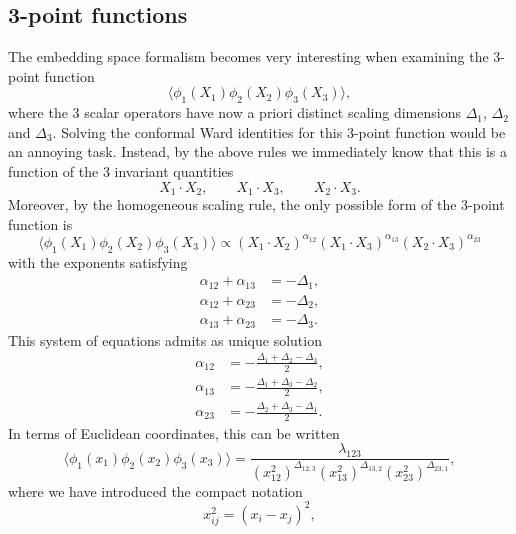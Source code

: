 \documentclass[a4paper,12pt]{article}
\numberwithin{equation}{section}
\begin{document}
\subsection{3-point functions}

The embedding space formalism becomes very interesting when examining the 3-point function
\begin{equation}
	\langle \phi_1(X_1) \phi_2(X_2) \phi_3(X_3) \rangle,
\end{equation}
where the 3 scalar operators have now a priori distinct scaling dimensions $\Delta_1$, $\Delta_2$ and $\Delta_3$.
Solving the conformal Ward identities for this 3-point function would be an annoying task. Instead, by the above rules we immediately know that this is a function of the 3 invariant quantities 
\begin{equation}
	X_1 \cdot X_2,
	\qquad
	X_1 \cdot X_3,
	\qquad
	X_2 \cdot X_3.
\end{equation}
Moreover, by the homogeneous scaling rule, the only possible form of the 3-point function is
\begin{equation}
	\langle \phi_1(X_1) \phi_2(X_2) \phi_3(X_3) \rangle
	\propto
	(X_1 \cdot X_2)^{\alpha_{12}}
	(X_1 \cdot X_3)^{\alpha_{13}}
	(X_2 \cdot X_3)^{\alpha_{23}}
\end{equation}
with the exponents satisfying 
\begin{align}
	\alpha_{12} + \alpha_{13} &= - \Delta_1,
	\nonumber \\
	\alpha_{12} + \alpha_{23} &= - \Delta_2,
	\\
	\alpha_{13} + \alpha_{23} &= - \Delta_3.
	\nonumber
\end{align}
This system of equations admits as unique solution
\begin{align}
	\alpha_{12} &= - \frac{\Delta_1 + \Delta_2 - \Delta_3}{2},
	\nonumber \\
	\alpha_{13} &= - \frac{\Delta_1 + \Delta_3 - \Delta_2}{2},
	\\
	\alpha_{23} &= - \frac{\Delta_2 + \Delta_3 - \Delta_1}{2}.
\end{align}
In terms of Euclidean coordinates, this can be written
\begin{equation}
	\langle \phi_1(x_1) \phi_2(x_2) \phi_3(x_3) \rangle
	= \frac{\lambda_{123}}
	{(x_{12}^2)^{\Delta_{12,3}}
	(x_{13}^2)^{\Delta_{13,2}}
	(x_{23}^2)^{\Delta_{23,1}}},
	\label{eq:3ptfunction}
\end{equation}
where we have introduced the compact notation
\begin{equation}
	x_{ij}^2 = (x_i - x_j)^2,
\end{equation}
\end{document}
